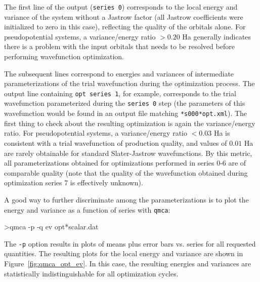 The first line of 
the output (\texttt{series 0}) corresponds to the local energy 
and variance of the system without a Jastrow factor (all Jastrow 
coefficients were initialized to zero in this case), reflecting the 
quality of the orbitals alone. For pseudopotential systems, a 
variance/energy ratio $>0.20$ Ha generally indicates there is a problem 
with the input orbitals that needs to be resolved before 
performing wavefunction optimization.  

The subsequent lines correspond to energies and variances of 
intermediate parameterizations of the trial wavefunction during 
the optimization process.  The output line containing 
\texttt{opt  series 1}, for example, corresponds to the trial 
wavefunction parameterized during the \texttt{series 0} step 
(the parameters of this wavefunction would be found in an output 
file matching \texttt{*s000*opt.xml}).  The first thing to check 
about the resulting optimization is again the variance/energy ratio. 
For pseudopotential systems, a variance/energy ratio $<0.03$ Ha is 
consistent with a trial wavefunction of production quality, and values 
of $0.01$ Ha are rarely obtainable for standard Slater-Jastrow 
wavefunctions.  By this metric, all parameterizations obtained for 
optimizations performed in series 0-6 are of comparable quality 
(note that the quality of the wavefunction obtained during optimization 
series 7 is effectively unknown).

A good way to further discriminate among the parameterizations is to 
plot the energy and variance as a function of series with \texttt{qmca}:
\begin{shade}
>qmca -p -q ev opt*scalar.dat
\end{shade}
\noindent
The \texttt{-p} option results in plots of means plus error bars 
vs. series for all requested quantities.
The resulting plots for the local energy and variance are shown 
in Figure~\ref{fig:qmca_opt_ev}.  In this case, the resulting energies 
and variances are statistically indistinguishable for all optimization 
cycles.  


